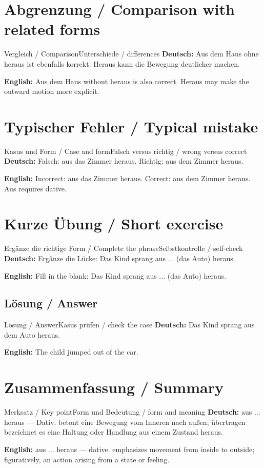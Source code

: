\documentclass[a4paper,11pt]{article}
\newcommand{\GermanText}[1]{\textbf{Deutsch: }#1\par}
\newcommand{\EnglishText}[1]{{\small\color{SoftGray}\textbf{English: }#1\par}}
\begin{document}
\section{Abgrenzung / Comparison with related forms}
\begin{grammarentry}{Vergleich / Comparison}{Unterschiede / differences}
\GermanText{Aus dem Haus ohne heraus ist ebenfalls korrekt. Heraus kann die Bewegung deutlicher machen.}
\EnglishText{Aus dem Haus without heraus is also correct. Heraus may make the outward motion more explicit.}
\end{grammarentry}
\section{Typischer Fehler / Typical mistake}
\begin{grammarentry}{Kasus und Form / Case and form}{Falsch versus richtig / wrong versus correct}
\GermanText{Falsch: aus das Zimmer heraus. Richtig: aus dem Zimmer heraus.}
\EnglishText{Incorrect: aus das Zimmer heraus. Correct: aus dem Zimmer heraus. Aus requires dative.}
\end{grammarentry}
\section{Kurze Übung / Short exercise}
\begin{grammarentry}{Ergänze die richtige Form / Complete the phrase}{Selbstkontrolle / self-check}
\GermanText{Ergänze die Lücke: Das Kind sprang aus ... (das Auto) heraus.}
\EnglishText{Fill in the blank: Das Kind sprang aus ... (das Auto) heraus.}
\end{grammarentry}
\subsection{Lösung / Answer}
\begin{grammarentry}{Lösung / Answer}{Kasus prüfen / check the case}
\GermanText{Das Kind sprang aus dem Auto heraus.}
\EnglishText{The child jumped out of the car.}
\end{grammarentry}
\section{Zusammenfassung / Summary}
\begin{grammarentry}{Merksatz / Key point}{Form und Bedeutung / form and meaning}
\GermanText{aus ... heraus — Dativ. betont eine Bewegung vom Inneren nach außen; übertragen bezeichnet es eine Haltung oder Handlung aus einem Zustand heraus.}
\EnglishText{aus ... heraus — dative. emphasizes movement from inside to outside; figuratively, an action arising from a state or feeling.}
\end{grammarentry}
\end{document}
